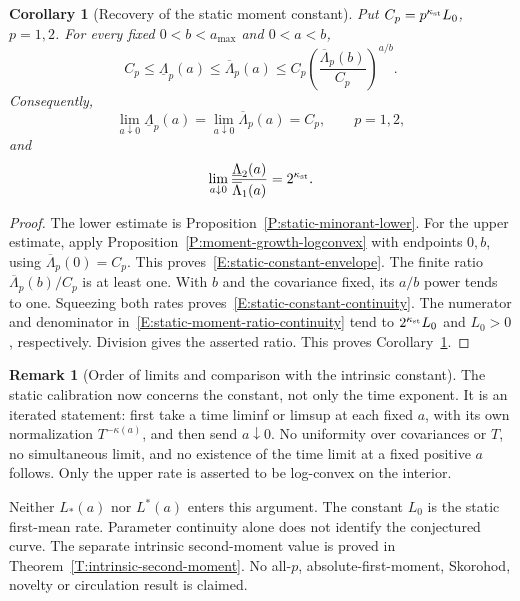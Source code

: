 \documentclass[12pt,oneside,openany]{book}
\makeatletter
\let\lean@pending\@empty
\newcommand{\LeanMarker}[1]{\gdef\lean@pending{#1}}
\numberwithin{equation}{section}
\newtheorem{corollary}[theorem]{Corollary}
\theoremstyle{nogostyle}
\theoremstyle{definition}
\newtheorem{remark}[theorem]{Remark}
\makeatother
\begin{document}
\LeanMarker{C:static-moment-constant-continuity}
\begin{corollary}[Recovery of the static moment constant]
  \label{C:static-moment-constant-continuity}
  Put \(C_p=p^{\kappa_{\rm st}}L_0\), \(p=1,2\). For every fixed
  \(0<b<a_{\max}\) and \(0<a<b\),
  \begin{equation}\label{E:static-constant-envelope}
    C_p\le\underline{\Lambda}_p(a)\le\overline{\Lambda}_p(a)
    \le C_p\left(\frac{\overline{\Lambda}_p(b)}{C_p}\right)^{a/b}.
  \end{equation}
  Consequently,
  \begin{equation}\label{E:static-constant-continuity}
    \lim_{a\downarrow0}\underline{\Lambda}_p(a)
    =\lim_{a\downarrow0}\overline{\Lambda}_p(a)=C_p,\qquad p=1,2,
  \end{equation}
  and
  \begin{equation}\label{E:static-moment-ratio-continuity}
    \lim_{a\downarrow0}
    \frac{\underline{\Lambda}_2(a)}{\overline{\Lambda}_1(a)}
    =2^{\kappa_{\rm st}}.
  \end{equation}
\end{corollary}

\begin{proof}
  The lower estimate is Proposition~\ref{P:static-minorant-lower}. For the upper
  estimate, apply Proposition~\ref{P:moment-growth-logconvex} with endpoints
  \(0,b\), using \(\overline{\Lambda}_p(0)=C_p\). This
  proves~\eqref{E:static-constant-envelope}. The finite ratio
  \(\overline{\Lambda}_p(b)/C_p\) is at least one. With \(b\) and the covariance
  fixed, its \(a/b\) power tends to one. Squeezing both rates
  proves~\eqref{E:static-constant-continuity}. The numerator and denominator
  in~\eqref{E:static-moment-ratio-continuity} tend to \(2^{\kappa_{\rm st}}L_0\)
  and \(L_0>0\), respectively. Division gives the asserted ratio. This proves
  Corollary~\ref{C:static-moment-constant-continuity}.
\end{proof}

\begin{remark}[Order of limits and comparison with the intrinsic constant]
  \label{R:temporal-type-scope}
  The static calibration now concerns the constant, not only the time exponent.
  It is an iterated statement: first take a time liminf or limsup at each fixed
  \(a\), with its own normalization \(T^{-\kappa(a)}\), and then send
  \(a\downarrow0\). No uniformity over covariances or \(T\), no simultaneous
  limit, and no existence of the time limit at a fixed positive \(a\) follows.
  Only the upper rate is asserted to be log-convex on the interior.

  Neither \(L_*(a)\) nor \(L^*(a)\) enters this argument. The constant \(L_0\)
  is the static first-mean rate. Parameter continuity alone does not identify
  the conjectured curve. The separate intrinsic second-moment value is proved in
  Theorem~\ref{T:intrinsic-second-moment}. No all-\(p\), absolute-first-moment,
  Skorohod, novelty or circulation result is claimed.
\end{remark}
\end{document}
